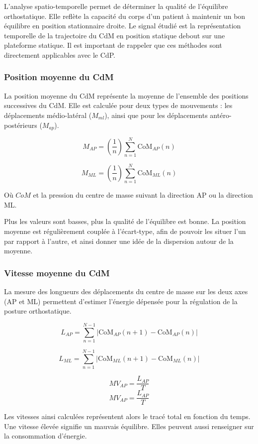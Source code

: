 L'analyse spatio-temporelle permet de déterminer la qualité de l'équilibre orthostatique. 
Elle reflète la capacité du corps d'un patient à maintenir un bon équilibre en position stationnaire droite. 
Le signal étudié est la représentation temporelle de la trajectoire du CdM en position statique debout sur une plateforme statique. 
Il est important de rappeler que ces méthodes sont directement applicables avec le CdP.

\subsubsection{Position moyenne du CdM}

La position moyenne du CdM représente la moyenne de l'ensemble des positions successives du CdM. 
Elle est calculée pour deux types de mouvements : les déplacements médio-latéral ($M_{ml}$), ainsi que pour les déplacements antéro-postérieurs ($M_{ap}$).

\[
M_{AP} = \left( \frac{1}{n} \right) \sum_{n=1}^N \mbox{CoM}_{AP}(n)
\]

\[
M_{ML} = \left( \frac{1}{n} \right) \sum_{n=1}^N \mbox{CoM}_{ML}(n)
\]

Où $CoM$ et la pression du centre de masse suivant la direction AP ou la direction ML.

Plus les valeurs sont basses, plus la qualité de l'équilibre est bonne. 
La position moyenne est régulièrement couplée à l'écart-type, afin de pouvoir les situer l'un par rapport à l'autre, et ainsi donner une idée de la dispersion autour de la moyenne.

\subsubsection{Vitesse moyenne du CdM}

La mesure des longueurs des déplacements du centre de masse sur les deux axes (AP et ML) permettent d'estimer l'énergie dépensée pour la régulation de la posture orthostatique.

\[
L_{AP} = \sum_{n=1}^{N-1} \left| \mbox{CoM}_{AP}(n+1) - \mbox{CoM}_{AP}(n) \right| \tag{5}
\]

\[
L_{ML} = \sum_{n=1}^{N-1} \left| \mbox{CoM}_{ML}(n+1) - \mbox{CoM}_{ML}(n) \right| \tag{6}
\]

\[
MV_{AP} = \frac{L_{AP}}{T}
\]
\[
MV_{AP} = \frac{L_{AP}}{T}
\]

Les vitesses ainsi calculées représentent alors le tracé total en fonction du temps. 
Une vitesse élevée signifie un mauvais équilibre. 
Elles peuvent aussi renseigner sur la consommation d'énergie.


